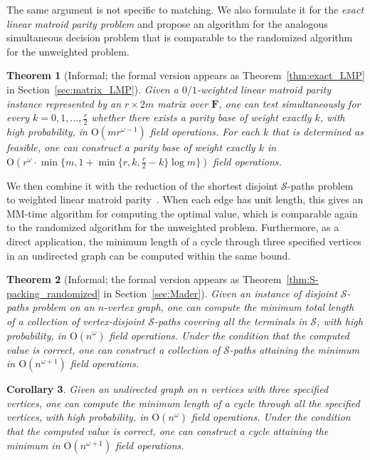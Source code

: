 \documentclass[11pt, a4paper]{article}
\theoremstyle{plain}
\newtheorem{theorem}{Theorem}[section]
\newtheorem{corollary}[theorem]{Corollary}
\theoremstyle{definition}
\theoremstyle{remark}
\newcommand{\cS}{\mathcal{S}}
\newcommand{\bF}{\mathbf{F}}
\begin{document}
The same argument is not specific to matching.
We also formulate it for the \emph{exact linear matroid parity problem} and propose an algorithm for the analogous simultaneous decision problem that is comparable to the randomized algorithm \cite[Theorem~1.2]{CLL2014} for the unweighted problem. 

\begin{theorem}[Informal; the formal version appears as Theorem~\ref{thm:exact_LMP} in Section~\ref{sec:matrix_LMP}]\label{thm:exact_LMP_informal}
Given a $0/1$-weighted linear matroid parity instance represented by an $r \times 2m$ matrix over $\bF$, one can test simultaneously for every $k=0,1,\dots,\frac{r}{2}$ whether there exists a parity base of weight exactly $k$, with high probability, in $\mathrm{O}(mr^{\omega - 1})$ field operations.
For each $k$ that is determined as feasible, one can construct a parity base of weight exactly $k$ in $\mathrm{O}(r^\omega \cdot \min\{m, 1 + \min\{r, k, \frac{r}{2} - k\} \log m\})$ field operations.
\end{theorem}

We then combine it with the reduction of the shortest disjoint $\mathcal{S}$-paths problem to weighted linear matroid parity~\cite{Yamaguchi2016}.
When each edge has unit length, this gives an MM-time algorithm for computing the optimal value, which is comparable again to the randomized algorithm \cite[Theorem~1.3]{CLL2014} for the unweighted problem. 
Furthermore, as a direct application, the minimum length of a cycle through three specified vertices in an undirected graph can be computed within the same bound.

\begin{theorem}[Informal; the formal version appears as Theorem~\ref{thm:S-packing_randomized} in Section~\ref{sec:Mader}]\label{thm:S-packing_randomized_informal}
Given an instance of disjoint $\cS$-paths problem on an $n$-vertex graph, one can compute the minimum total length of a collection of vertex-disjoint $\cS$-paths covering all the terminals in $\cS$, with high probability, in $\mathrm{O}(n^\omega)$ field operations.
Under the condition that the computed value is correct, one can construct a collection of $\cS$-paths attaining the minimum in $\mathrm{O}(n^{\omega+1})$ field operations.
\end{theorem}

\begin{corollary}\label{cor:cycle}
Given an undirected graph on $n$ vertices with three specified vertices, one can compute the minimum length of a cycle through all the specified vertices, with high probability, in $\mathrm{O}(n^\omega)$ field operations.
Under the condition that the computed value is correct, one can construct a cycle attaining the minimum in $\mathrm{O}(n^{\omega+1})$ field operations.
\end{corollary}
\end{document}
